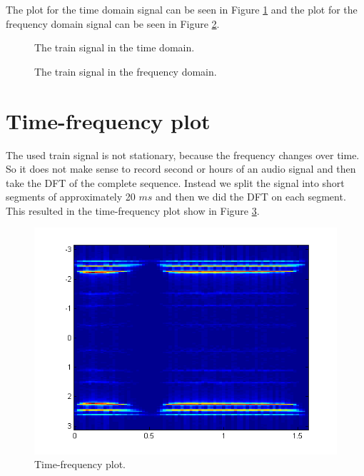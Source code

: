 \documentclass[final]{scrreprt} %
\begin{document}
The plot for the time domain signal can be seen in Figure \ref{fig:timedomain} and the plot for the frequency domain signal can be seen in Figure \ref{fig:freqdomain}.


\begin{figure}[H]
	\centering
	\setlength\figureheight{6cm}
    	\setlength\figurewidth{10cm}
	
	\caption{The train signal in the time domain.}
	\label{fig:timedomain}
\end{figure}



\begin{figure}[H]
	\centering
	\setlength\figureheight{6cm}
  	\setlength\figurewidth{10cm}
	
	\caption{The train signal in the frequency domain.}
	\label{fig:freqdomain}
\end{figure}

\section{Time-frequency plot}
The used train signal is not stationary, because the frequency changes over time. 
So it does not make sense to record second or hours of an audio signal and then take the DFT of the complete sequence. 
Instead we split the signal into short segments of approximately 20 $ms$ and then we did the DFT on each segment. 
This resulted in the time-frequency plot show in Figure \ref{fig:timefreq}.

\begin{figure}[h]
\centering
\includegraphics[scale = 0.5]{resources/labday1/timefrequentieplot.png}
\caption{Time-frequency plot.}
\label{fig:timefreq}
\end{figure}
\end{document}

